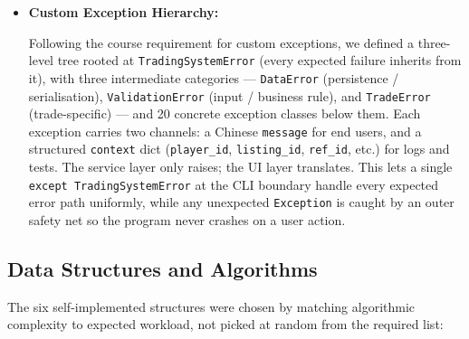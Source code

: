 \documentclass[11pt,a4paper]{article}
\begin{document}
\begin{itemize}
    Behavioural mixins (\texttt{Durable}, \texttt{Equippable}, \texttt{Stackable}) add a second axis of polymorphism: weapons and tools share wear-and-tear semantics via \texttt{Durable}; consumables and misc items share stacking semantics via \texttt{Stackable}. This avoids the classical "diamond" problem of deep single-inheritance while still letting the inventory code ask \texttt{isinstance(item, Stackable)} to decide whether to merge slots.

    \item \textbf{Custom Exception Hierarchy:}

    Following the course requirement for custom exceptions, we defined a three-level tree rooted at \texttt{TradingSystemError} (every expected failure inherits from it), with three intermediate categories — \texttt{DataError} (persistence / serialisation), \texttt{ValidationError} (input / business rule), and \texttt{TradeError} (trade-specific) — and 20 concrete exception classes below them. Each exception carries two channels: a Chinese \texttt{message} for end users, and a structured \texttt{context} dict (\texttt{player\_id}, \texttt{listing\_id}, \texttt{ref\_id}, etc.) for logs and tests. The service layer only raises; the UI layer translates. This lets a single \texttt{except TradingSystemError} at the CLI boundary handle every expected error path uniformly, while any unexpected \texttt{Exception} is caught by an outer safety net so the program never crashes on a user action.

\end{itemize}

\subsection{Data Structures and Algorithms}

The six self-implemented structures were chosen by matching algorithmic complexity to expected workload, not picked at random from the required list:
\end{document}
